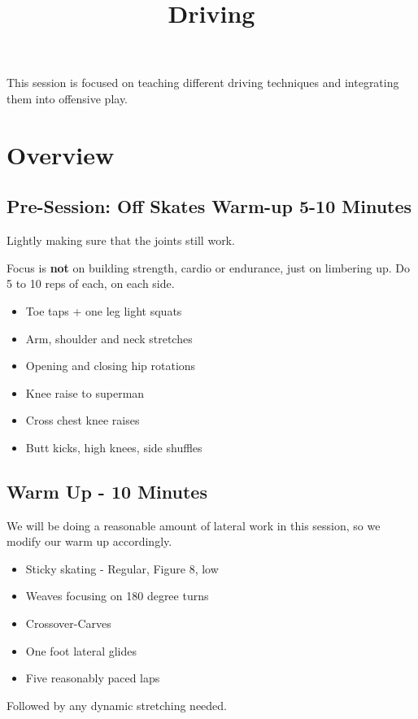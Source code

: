 \documentclass{journal}
\title{Driving}
\author{}
\begin{document}
\maketitle
\noindent 

This session is focused on teaching different driving techniques and integrating them into offensive play.


\section*{Overview}

\subsection*{Pre-Session: Off Skates Warm-up 5-10 Minutes}
Lightly making sure that the joints still work.

Focus is {\bf not} on building strength, cardio or endurance, just on limbering up. Do 5 to 10 reps of each, on each side. 

\begin{itemize}
\item Toe taps + one leg light squats
\item Arm, shoulder and neck stretches
\item Opening and closing hip rotations
\item Knee raise to superman 
\item Cross chest knee raises
\item Butt kicks, high knees, side shuffles
\end{itemize}


\subsection*{Warm Up - 10 Minutes}

We will be doing a reasonable amount of lateral work in this session, so we modify our warm up accordingly.
\begin{itemize}
\item Sticky skating - Regular, Figure 8, low
\item Weaves focusing on 180 degree turns 
\item Crossover-Carves 
\item One foot lateral glides
\item Five reasonably paced laps
\end{itemize}

Followed by any dynamic stretching needed.
\end{document}
